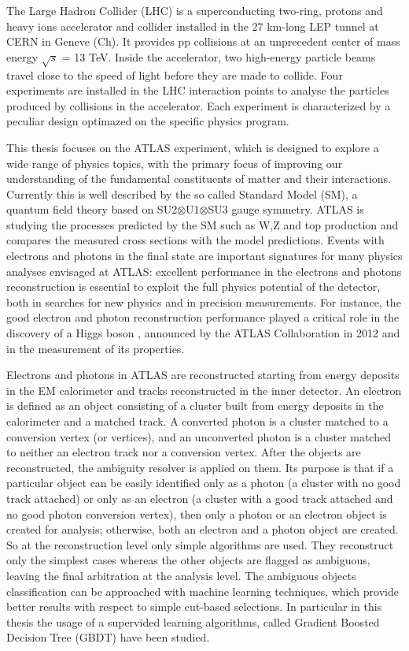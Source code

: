 \documentclass[a4paper, oneside, 11pt]{book}
\begin{document}
	The Large Hadron Collider (LHC) \cite{LHC} is a superconducting two-ring, protons and heavy ions accelerator and collider installed in the 27 km-long LEP tunnel at CERN in Geneve (Ch). It provides pp collisions at an unprecedent center of mass energy $\sqrt{s}$ = 13 TeV. Inside the accelerator, two high-energy particle beams travel close to the speed of light before they are made to collide. Four experiments are installed in the LHC interaction points to analyse the particles produced by collisions in the accelerator. Each experiment is characterized by a peculiar design optimazed on the specific physics program.
	
	This thesis focuses on the ATLAS \cite{ATLAS} experiment, which is designed to explore a wide range of physics topics, with the primary focus of improving our understanding of the fundamental constituents of matter and their interactions.
	Currently this is well described by the so called Standard Model (SM), a quantum field theory based on SU2$\otimes$U1$\otimes$SU3 gauge symmetry. ATLAS is studying the processes predicted by the SM such as W,Z and top production and compares the measured cross sections with the model predictions. Events with electrons and photons in the final state are important signatures for many
	physics analyses envisaged at ATLAS: excellent performance in the electrons and photons reconstruction is essential to exploit the full physics potential of the detector, both in searches for new physics and in precision measurements. For instance, the good electron and photon reconstruction performance played a critical role in the discovery of a Higgs boson \cite{Higgs}, announced by the ATLAS Collaboration in 2012 and in the measurement of its properties.
	
	Electrons and photons in ATLAS are reconstructed starting from energy deposits in the EM calorimeter and tracks reconstructed in the inner detector. An electron is defined as an object consisting of a cluster built from energy deposits in the calorimeter and a matched track. A converted photon is a cluster matched to a conversion vertex (or vertices), and an unconverted photon is a cluster matched to neither an electron track nor a conversion vertex. After the objects are reconstructed, the ambiguity resolver is applied on them. Its purpose is that if a particular object can be easily identified only as a photon (a cluster with no good track attached) or only as an electron (a cluster with a good track attached and no good photon conversion vertex), then only a photon or an electron object is created for analysis; otherwise, both an electron and a photon object are created. So at the reconstruction level only simple algorithms are used. They reconstruct only the simplest cases whereas the other objects are flagged as ambiguous, leaving the final arbitration at the analysis level. The ambiguous objects classification can be approached with machine learning techniques, which provide better results with respect to simple cut-based selections. In particular in this thesis the usage of a supervided learning algorithms, called Gradient Boosted  Decision Tree (GBDT) have been studied.
	
\end{document}
